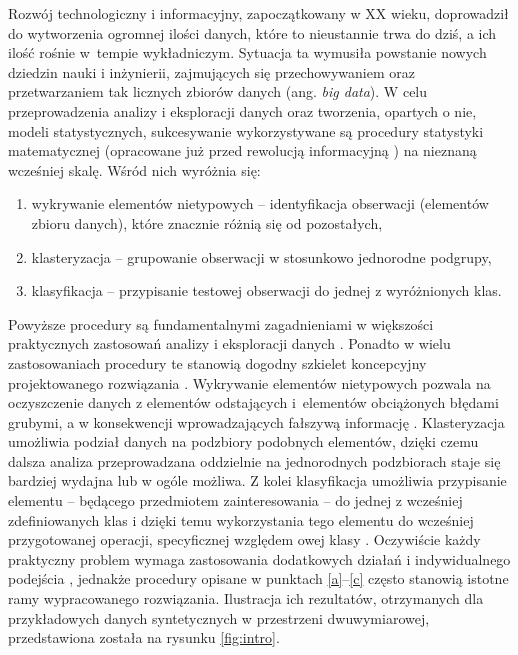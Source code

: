 \documentclass[12pt,a4paper,oneside]{book}
\theoremstyle{definition}
\begin{document}
Rozwój technologiczny i informacyjny, zapoczątkowany w XX wieku, doprowadził do wytworzenia ogromnej ilości danych, które to nieustannie trwa do dziś, a ich ilość rośnie w~tempie wykładniczym. Sytuacja ta wymusiła powstanie nowych dziedzin nauki i inżynierii, zajmujących się przechowywaniem oraz przetwarzaniem tak licznych zbiorów danych (ang. \textit{big data}). W celu przeprowadzenia analizy i eksploracji danych oraz tworzenia, opartych o nie,  modeli statystycznych, sukcesywanie wykorzystywane są procedury statystyki matematycznej (opracowane już przed rewolucją informacyjną \cite{Robertson_1990}) na nieznaną wcześniej skalę. Wśród nich wyróżnia się:
\begin{enumerate}[label=(\alph*)] %
\item \label{a} wykrywanie elementów nietypowych \cite{Aggarwal_2017, Barnett_1978} -- identyfikacja obserwacji (elementów zbioru danych), które znacznie różnią się od pozostałych,
\item klasteryzacja \cite{Xu_2008} -- grupowanie obserwacji w stosunkowo jednorodne podgrupy,
\item \label{c} klasyfikacja \cite{Duda_2000} -- przypisanie testowej obserwacji do jednej z wyróżnionych klas.
\end{enumerate}
Powyższe procedury są fundamentalnymi zagadnieniami w większości praktycznych zastosowań analizy i eksploracji danych \cite{Nisbet_2018}. Ponadto w wielu zastosowaniach procedury te stanowią dogodny szkielet koncepcyjny projektowanego rozwiązania \cite{Aggarwal_2015}. Wykrywanie elementów nietypowych pozwala na oczyszczenie danych z elementów odstających i~elementów obciążonych błędami grubymi, a w konsekwencji wprowadzających fałszywą informację \cite{Zieba_2013}. Klasteryzacja umożliwia podział danych na podzbiory podobnych elementów, dzięki czemu dalsza analiza przeprowadzana oddzielnie na jednorodnych podzbiorach staje się bardziej wydajna lub w ogóle możliwa. Z kolei klasyfikacja umożliwia przypisanie elementu -- będącego przedmiotem zainteresowania -- do jednej z wcześniej zdefiniowanych klas i dzięki temu wykorzystania tego elementu do wcześniej przygotowanej operacji, specyficznej względem owej klasy \cite{Kulczycki_2007}. Oczywiście każdy praktyczny problem wymaga zastosowania dodatkowych działań i indywidualnego podejścia \cite{Larose_2014}, jednakże procedury opisane w punktach \ref{a}--\ref{c} często stanowią istotne ramy wypracowanego rozwiązania. Ilustracja ich rezultatów, otrzymanych dla przykładowych danych syntetycznych w przestrzeni dwuwymiarowej, przedstawiona została na rysunku \ref{fig:intro}.
\end{document}
